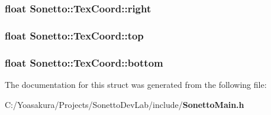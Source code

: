 \subsubsection{\setlength{\rightskip}{0pt plus 5cm}float {\bf Sonetto::TexCoord::right}}\label{struct_sonetto_1_1_tex_coord_f2d9bb8aed9a6b3eb81afc561805a243}


\subsubsection{\setlength{\rightskip}{0pt plus 5cm}float {\bf Sonetto::TexCoord::top}}\label{struct_sonetto_1_1_tex_coord_cf64d0e9d7a5b20a2ec9fdcc081ee190}


\subsubsection{\setlength{\rightskip}{0pt plus 5cm}float {\bf Sonetto::TexCoord::bottom}}\label{struct_sonetto_1_1_tex_coord_891d65775cb149f3d7b2ebeadad7db82}




The documentation for this struct was generated from the following file:\begin{CompactItemize}
\item 
C:/Yoasakura/Projects/SonettoDevLab/include/{\bf SonettoMain.h}\end{CompactItemize}
